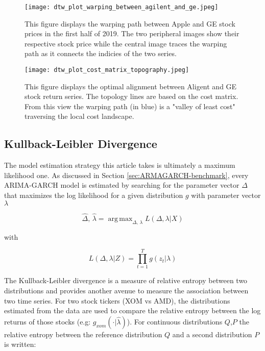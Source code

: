 \documentclass[12pt]{article}
\DeclareMathOperator*{\argmax}{arg\,max}
\begin{document}
\begin{figure}
    \centering
    \texttt{[image: dtw\_plot\_warping\_between\_agilent\_and\_ge.jpeg]}
    \caption{This figure displays the warping path between Apple and GE stock prices in the first half of 2019. The two peripheral images show their respective stock price while the central image traces the warping path as it connects the indicies of the two series.}
    \label{fig:dtw_plot_warping_between_agilent_and_ge}
\end{figure}

\begin{figure}
    \centering
    \texttt{[image: dtw\_plot\_cost\_matrix\_topography.jpeg]}
    \caption{This figure displays the optimal alignment between Aligent and GE stock return series. The topology lines are based on the cost matrix. From this view the warping path (in blue) is a "valley of least cost" traversing the local cost landscape.}
    \label{fig:dtw_plot_cost_matrix_topography}
\end{figure}


\subsection{Kullback-Leibler Divergence} \label{sec:KL-Divergence}

The model estimation strategy this article takes is ultimately a maximum likelihood one. As discussed in Section \ref{sec:ARMAGARCH-benchmark}, every ARIMA-GARCH model is estimated by searching for the parameter vector $\Delta$ that maximizes the log likelihood for a given distribution $g$ with parameter vector $\lambda$

\begin{equation}
    \hat{\Delta},\, \hat{\lambda} = \argmax_{\Delta,\, \lambda} L(\Delta, \lambda | X)
\end{equation}

with 

\begin{equation}
    L(\Delta, \lambda | Z) = \prod_{t=1}^{T} g(z_{t}| \lambda)
\end{equation}

The Kullback-Leibler divergence is a measure of relative entropy between two distributions and provides another avenue to measure the association between two time series. For two stock tickers (XOM vs AMD), the distributions estimated from the data are used to compare the relative entropy between the log returns of those stocks (e.g: $g_{xom}(\cdot|\hat{\lambda})$). For continuous distributions $Q$,$P$ the relative entropy between the reference distribution $Q$ and a second distribution $P$ is written:
\end{document}
